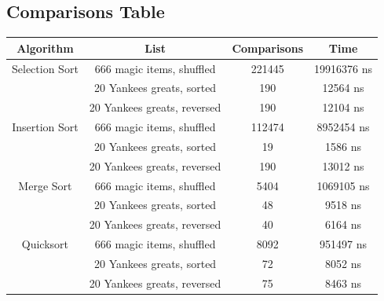 \documentclass[letterpaper, 10pt,DIV=13]{scrartcl}
\numberwithin{equation}{section} %
\numberwithin{figure}{section} %
\numberwithin{table}{section} %
\begin{document}
\subsection{Comparisons Table}\label{comparisonsTable}
\begin{center}
  \begin{tabular}{|c|c|c|c|}
    \hline
    Algorithm & List & Comparisons & Time \\
    \hline
    Selection Sort & 666 magic items, shuffled & 221445 & 19916376 ns \\
    \hline
    & 20 Yankees greats, sorted & 190 & 12564 ns \\
    \hline
    & 20 Yankees greats, reversed & 190 & 12104 ns \\
    \hline
    Insertion Sort & 666 magic items, shuffled & 112474 & 8952454 ns \\
    \hline
    & 20 Yankees greats, sorted & 19 & 1586 ns \\
    \hline
    & 20 Yankees greats, reversed & 190 & 13012 ns \\
    \hline
    Merge Sort & 666 magic items, shuffled & 5404 & 1069105 ns \\
    \hline
    & 20 Yankees greats, sorted & 48 & 9518 ns \\
    \hline
    & 20 Yankees greats, reversed & 40 & 6164 ns \\
    \hline
    Quicksort & 666 magic items, shuffled & 8092 & 951497 ns \\
    \hline
    & 20 Yankees greats, sorted & 72 & 8052 ns \\
    \hline
    & 20 Yankees greats, reversed & 75 & 8463 ns \\
    \hline
  \end{tabular}
\end{center}

\lstset{numbers=left, numberstyle=\tiny, stepnumber=1, numbersep=5pt}

\end{document}
